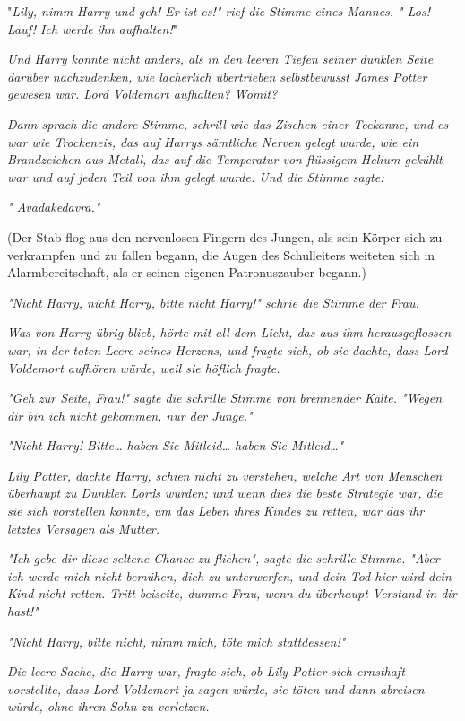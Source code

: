 {"\emph{Lily, nimm Harry und geh! Er ist es!" rief die Stimme eines Mannes. " Los! Lauf! Ich werde} \emph{ihn aufhalten!}"

\emph{\emph{Und Harry konnte nicht anders, als in den leeren Tiefen seiner dunklen Seite darüber nachzudenken, wie lächerlich übertrieben selbstbewusst James Potter gewesen war. Lord Voldemort aufhalten? Womit?}}

\emph{\emph{Dann sprach die andere Stimme, schrill wie das Zischen einer Teekanne, und es war wie Trockeneis, das auf Harrys sämtliche Nerven gelegt wurde, wie ein} \emph{Brandzeichen} \emph{aus Metall, das auf} \emph{die Temperatur von} \emph{flüssigem} \emph{Helium gekühlt} \emph{war} \emph{und auf jeden Teil von ihm gelegt wurde. Und die Stimme sagte:}}

\emph{\emph{" Avadakedavra."}}

(Der Stab flog aus den nervenlosen Fingern des Jungen, als sein Körper sich zu verkrampfen und zu fallen begann, die Augen des Schulleiters weiteten sich in Alarmbereitschaft, als er seinen eigenen Patronuszauber begann.)

\emph{\emph{"Nicht Harry, nicht Harry, bitte nicht Harry!" schrie die Stimme der Frau.}}

\emph{\emph{Was von Harry übrig blieb, hörte mit all dem Licht, das aus ihm herausgeflossen war, in der toten Leere seines Herzens, und fragte sich, ob sie dachte, dass Lord Voldemort aufhören würde, weil sie höflich fragte.}}

\emph{\emph{"Geh zur Seite, Frau!" sagte die schrille Stimme von brennender Kälte. "Wegen dir bin ich nicht gekommen, nur der Junge."}}

\emph{\emph{"Nicht Harry! Bitte… haben Sie Mitleid… haben Sie Mitleid…"}}

\emph{\emph{Lily Potter, dachte Harry, schien nicht zu verstehen, welche Art von Menschen überhaupt zu Dunklen Lords wurden; und wenn dies die beste Strategie war, die sie sich vorstellen konnte, um das Leben ihres Kindes zu retten, war das ihr letztes Versagen als Mutter.}}

\emph{\emph{"Ich gebe dir diese seltene Chance zu fliehen", sagte die schrille Stimme. "Aber ich werde mich nicht bemühen, dich zu unterwerfen, und dein Tod hier wird dein Kind nicht retten. Tritt beiseite, dumme Frau, wenn du überhaupt Verstand in dir hast!"}}

\emph{\emph{"Nicht Harry, bitte nicht, nimm mich, töte mich stattdessen!"}}

\emph{\emph{Die leere Sache, die Harry war, fragte sich, ob Lily Potter sich ernsthaft vorstellte, dass Lord Voldemort ja sagen würde, sie töten und dann abreisen würde, ohne ihren Sohn zu verletzen.}}

}
